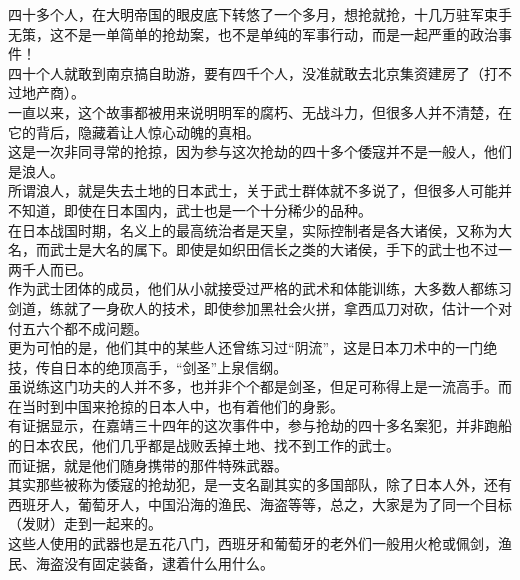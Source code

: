 \begin{multicols}{\theparacolNo}
四十多个人，在大明帝国的眼皮底下转悠了一个多月，想抢就抢，十几万驻军束手无策，这不是一单简单的抢劫案，也不是单纯的军事行动，而是一起严重的政治事件！\\

四十个人就敢到南京搞自助游，要有四千个人，没准就敢去北京集资建房了（打不过地产商）。\\

一直以来，这个故事都被用来说明明军的腐朽、无战斗力，但很多人并不清楚，在它的背后，隐藏着让人惊心动魄的真相。\\

这是一次非同寻常的抢掠，因为参与这次抢劫的四十多个倭寇并不是一般人，他们是浪人。\\

所谓浪人，就是失去土地的日本武士，关于武士群体就不多说了，但很多人可能并不知道，即使在日本国内，武士也是一个十分稀少的品种。\\

在日本战国时期，名义上的最高统治者是天皇，实际控制者是各大诸侯，又称为大名，而武士是大名的属下。即使是如织田信长之类的大诸侯，手下的武士也不过一两千人而已。\\

作为武士团体的成员，他们从小就接受过严格的武术和体能训练，大多数人都练习剑道，练就了一身砍人的技术，即使参加黑社会火拼，拿西瓜刀对砍，估计一个对付五六个都不成问题。\\

更为可怕的是，他们其中的某些人还曾练习过“阴流”，这是日本刀术中的一门绝技，传自日本的绝顶高手，“剑圣”上泉信纲。\\

虽说练这门功夫的人并不多，也并非个个都是剑圣，但足可称得上是一流高手。而在当时到中国来抢掠的日本人中，也有着他们的身影。\\

有证据显示，在嘉靖三十四年的这次事件中，参与抢劫的四十多名案犯，并非跑船的日本农民，他们几乎都是战败丢掉土地、找不到工作的武士。\\

而证据，就是他们随身携带的那件特殊武器。\\

其实那些被称为倭寇的抢劫犯，是一支名副其实的多国部队，除了日本人外，还有西班牙人，葡萄牙人，中国沿海的渔民、海盗等等，总之，大家是为了同一个目标（发财）走到一起来的。\\

这些人使用的武器也是五花八门，西班牙和葡萄牙的老外们一般用火枪或佩剑，渔民、海盗没有固定装备，逮着什么用什么。\\


\end{multicols}
